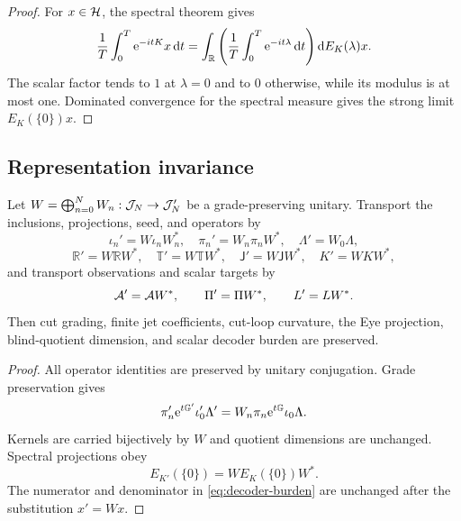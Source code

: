 \begin{proof}
For $x\in\mathcal H$, the spectral theorem gives
\[
\frac1T\int_0^T\mathrm e^{-itK}x\,\mathrm d t
=\int_\mathbb R
\left(\frac1T\int_0^T\mathrm e^{-it\lambda}\,\mathrm d t\right)
\mathrm d E_K(\lambda)x.
\]
The scalar factor tends to $1$ at $\lambda=0$ and to $0$ otherwise, while its modulus is at most one.  Dominated convergence for the spectral measure gives the strong limit $E_K(\{0\})x$.
\end{proof}

\subsection{Representation invariance}

\begin{proposition}
Let $W=\bigoplus_{n=0}^N W_n:\mathcal J_N\to\mathcal J_N'$ be a grade-preserving unitary.  Transport the inclusions, projections, seed, and operators by
\[
\iota_n'=W\iota_nW_n^*,\quad
\pi_n'=W_n\pi_nW^*,\quad
\Lambda'=W_0\Lambda,
\]
\[
\mathbb R'=W\mathbb RW^*,\quad
\mathbb T'=W\mathbb TW^*,\quad
\mathsf J'=W\mathsf JW^*,\quad
K'=WKW^*,
\]
and transport observations and scalar targets by
\[
\mathcal A'=\mathcal A W^*,\qquad
\Pi'=\Pi W^*,\qquad
L'=LW^*.
\]
Then cut grading, finite jet coefficients, cut-loop curvature, the Eye projection, blind-quotient dimension, and scalar decoder burden are preserved.
\end{proposition}

\begin{proof}
All operator identities are preserved by unitary conjugation.  Grade preservation gives
\[
\pi_n'\mathrm e^{t\mathbb G'}\iota_0'\Lambda'
=W_n\pi_n\mathrm e^{t\mathbb G}\iota_0\Lambda.
\]
Kernels are carried bijectively by $W$ and quotient dimensions are unchanged.  Spectral projections obey
\[
E_{K'}(\{0\})=WE_K(\{0\})W^*.
\]
The numerator and denominator in \eqref{eq:decoder-burden} are unchanged after the substitution $x'=Wx$.
\end{proof}
